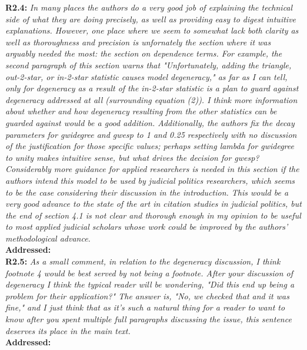 \documentclass[a4paper,11pt]{texMemo}
\begin{document}
\noindent \textbf{R2.4:} \emph{ In many places the authors do a very good job of explaining the technical side of what they are doing precisely, as well as providing easy to digest intuitive explanations. However, one place where we seem to somewhat lack both clarity as well as thoroughness and precision is unfornately the section where it was arguably needed the most: the section on dependence terms. For example, the second paragraph of this section warns that "Unfortunately, adding the triangle, out-2-star, or in-2-star statistic causes model degeneracy," as far as I can tell, only for degeneracy as a result of the in-2-star statistic is a plan to guard against degeneracy addressed at all (surrounding equation (2)). I think more information about whether and how degeneracy resulting from the other statistics can be guarded against would be a good addition. Additionally, the authors fix the decay parameters for gwidegree and gwesp to 1 and 0.25 respectively with no discussion of the justification for those specific values; perhaps setting lambda for gwidegree to unity makes intuitive sense, but what drives the decision for gwesp? Considerably more guidance for applied researchers is needed in this section if the authors intend this model to be used by judicial politics researchers, which seems to be the case considering their discussion in the introduction. This would be a very good advance to the state of the art in citation studies in judicial politics, but the end of section 4.1 is not clear and thorough enough in my opinion to be useful to most applied judicial scholars whose work could be improved by the authors' methodological advance.}\\

\noindent \textbf{Addressed:}  \\

\noindent \textbf{R2.5:} \emph{ As a small comment, in relation to the degeneracy discussion, I think footnote 4 would be best served by not being a footnote. After your discussion of degeneracy I think the typical reader will be wondering, "Did this end up being a problem for their application?" The answer is, "No, we checked that and it was fine," and I just think that as it's such a natural thing for a reader to want to know after you spent multiple full paragraphs discussing the issue, this sentence deserves its place in the main text.}\\

\noindent \textbf{Addressed:}  \\
\end{document}
